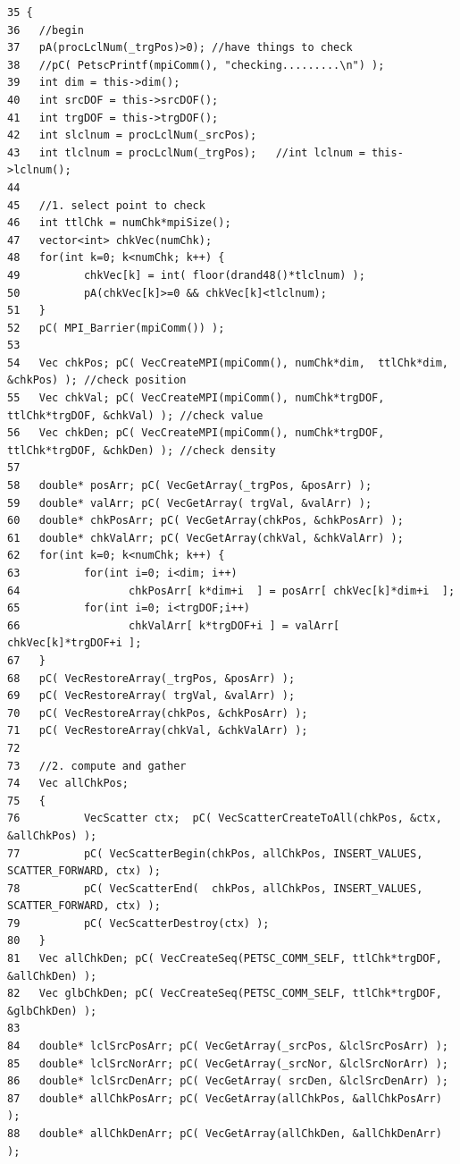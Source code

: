 \footnotesize\begin{verbatim}35 {
36   //begin
37   pA(procLclNum(_trgPos)>0); //have things to check
38   //pC( PetscPrintf(mpiComm(), "checking.........\n") );
39   int dim = this->dim();
40   int srcDOF = this->srcDOF();
41   int trgDOF = this->trgDOF();
42   int slclnum = procLclNum(_srcPos);
43   int tlclnum = procLclNum(_trgPos);   //int lclnum = this->lclnum();
44   
45   //1. select point to check
46   int ttlChk = numChk*mpiSize();
47   vector<int> chkVec(numChk);
48   for(int k=0; k<numChk; k++) {
49          chkVec[k] = int( floor(drand48()*tlclnum) );
50          pA(chkVec[k]>=0 && chkVec[k]<tlclnum);
51   }
52   pC( MPI_Barrier(mpiComm()) );
53   
54   Vec chkPos; pC( VecCreateMPI(mpiComm(), numChk*dim,  ttlChk*dim,  &chkPos) ); //check position
55   Vec chkVal; pC( VecCreateMPI(mpiComm(), numChk*trgDOF, ttlChk*trgDOF, &chkVal) ); //check value
56   Vec chkDen; pC( VecCreateMPI(mpiComm(), numChk*trgDOF, ttlChk*trgDOF, &chkDen) ); //check density
57   
58   double* posArr; pC( VecGetArray(_trgPos, &posArr) );
59   double* valArr; pC( VecGetArray( trgVal, &valArr) );
60   double* chkPosArr; pC( VecGetArray(chkPos, &chkPosArr) );
61   double* chkValArr; pC( VecGetArray(chkVal, &chkValArr) );
62   for(int k=0; k<numChk; k++) {
63          for(int i=0; i<dim; i++)
64                 chkPosArr[ k*dim+i  ] = posArr[ chkVec[k]*dim+i  ];
65          for(int i=0; i<trgDOF;i++)
66                 chkValArr[ k*trgDOF+i ] = valArr[ chkVec[k]*trgDOF+i ];
67   } 
68   pC( VecRestoreArray(_trgPos, &posArr) );
69   pC( VecRestoreArray( trgVal, &valArr) );
70   pC( VecRestoreArray(chkPos, &chkPosArr) );
71   pC( VecRestoreArray(chkVal, &chkValArr) );
72   
73   //2. compute and gather
74   Vec allChkPos;
75   {
76          VecScatter ctx;  pC( VecScatterCreateToAll(chkPos, &ctx, &allChkPos) );
77          pC( VecScatterBegin(chkPos, allChkPos, INSERT_VALUES, SCATTER_FORWARD, ctx) );
78          pC( VecScatterEnd(  chkPos, allChkPos, INSERT_VALUES, SCATTER_FORWARD, ctx) );
79          pC( VecScatterDestroy(ctx) );
80   }
81   Vec allChkDen; pC( VecCreateSeq(PETSC_COMM_SELF, ttlChk*trgDOF, &allChkDen) );
82   Vec glbChkDen; pC( VecCreateSeq(PETSC_COMM_SELF, ttlChk*trgDOF, &glbChkDen) );
83   
84   double* lclSrcPosArr; pC( VecGetArray(_srcPos, &lclSrcPosArr) );
85   double* lclSrcNorArr; pC( VecGetArray(_srcNor, &lclSrcNorArr) );
86   double* lclSrcDenArr; pC( VecGetArray( srcDen, &lclSrcDenArr) );
87   double* allChkPosArr; pC( VecGetArray(allChkPos, &allChkPosArr) );
88   double* allChkDenArr; pC( VecGetArray(allChkDen, &allChkDenArr) );

\end{verbatim}
